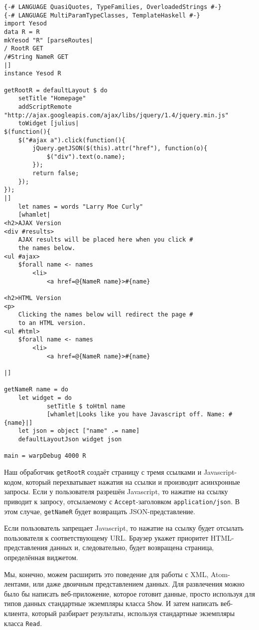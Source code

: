 \begin{lstlisting}
{-# LANGUAGE QuasiQuotes, TypeFamilies, OverloadedStrings #-}
{-# LANGUAGE MultiParamTypeClasses, TemplateHaskell #-}
import Yesod
data R = R
mkYesod "R" [parseRoutes|
/ RootR GET
/#String NameR GET
|]
instance Yesod R

getRootR = defaultLayout $ do
    setTitle "Homepage"
    addScriptRemote "http://ajax.googleapis.com/ajax/libs/jquery/1.4/jquery.min.js"
    toWidget [julius|
$(function(){
    $("#ajax a").click(function(){
        jQuery.getJSON($(this).attr("href"), function(o){
            $("div").text(o.name);
        });
        return false;
    });
});
|]
    let names = words "Larry Moe Curly"
    [whamlet|
<h2>AJAX Version
<div #results>
    AJAX results will be placed here when you click #
    the names below.
<ul #ajax>
    $forall name <- names
        <li>
            <a href=@{NameR name}>#{name}

<h2>HTML Version
<p>
    Clicking the names below will redirect the page #
    to an HTML version.
<ul #html>
    $forall name <- names
        <li>
            <a href=@{NameR name}>#{name}

|]

getNameR name = do
    let widget = do
            setTitle $ toHtml name
            [whamlet|Looks like you have Javascript off. Name: #{name}|]
    let json = object ["name" .= name]
    defaultLayoutJson widget json

main = warpDebug 4000 R

\end{lstlisting}

Наш обработчик \lstinline'getRootR' создаёт страницу с тремя ссылками и Javascript-кодом,
который перехватывает нажатия на ссылки и производит асинхронные запросы. Если у
пользователя разрешён Javascript, то нажатие на ссылку приводит к запросу, отсылаемому с
\verb*|Accept|-заголовком \verb*|application/json|. В этом случае, \lstinline'getNameR'
будет возвращать JSON-представление.

Если пользователь запрещает Javascript, то нажатие на ссылку будет отсылать пользователя к соответствующему URL. Браузер укажет приоритет HTML-представления данных и, следовательно, будет возвращена страница, определённая виджетом.

Мы, конечно, можем расширить это поведение для работы с XML, Atom-лентами, или даже
двоичным представлением данных. Для развлечения можно было бы написать веб-приложение,
которое готовит данные, просто используя для типов данных стандартные экземпляры класса
\lstinline'Show'. И затем написать веб-клиента, который разбирает результаты, используя
стандартные экземпляры класса \lstinline'Read'.

